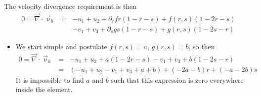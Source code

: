 The velocity divergence requirement is then
\begin{eqnarray}
0=\vec\nabla\cdot\vec\upnu_h 
&=& 
  -u_1+u_2 + \partial_r f r(1-r-s) + f(r,s)(1-2r-s) \\
&&-v_1+v_3 + \partial_s g s(1-r-s) + g(r,s)(1-2s-r)
\end{eqnarray}

\begin{itemize}
\item
We start simple and postulate $f(r,s)=a$, $g(r,s)=b$, so then 
\begin{eqnarray}
0=\vec\nabla\cdot\vec\upnu_h 
&=&   -u_1+u_2 +  a(1-2r-s) -v_1+v_3 +  b(1-2s-r) \\
&=&  (-u_1+u_2-v_1+v_3 +a +b ) + (-2a-b)r + (-a-2b)s
\end{eqnarray}
It is impossible to find $a$ and $b$ such that this expression is zero everywhere inside the element.


\end{itemize}
